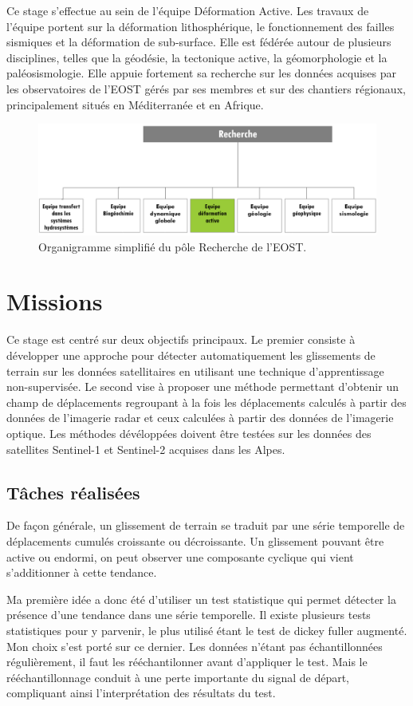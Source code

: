\documentclass[11pt, openany]{report}
\begin{document}
Ce stage s'effectue au sein de l'équipe Déformation Active. Les travaux de l'équipe portent sur la déformation lithosphérique, le fonctionnement des failles sismiques et la déformation de sub-surface. Elle est fédérée autour de plusieurs disciplines, telles que la géodésie, la tectonique active, la géomorphologie et la paléosismologie. Elle appuie fortement sa recherche sur les données acquises par les observatoires de l'EOST gérés par ses membres et sur des chantiers régionaux, principalement situés en Méditerranée et en Afrique.

\begin{figure}[H]
  \centering
  \includegraphics[width=0.6\linewidth]{recherche.png}
  \caption{Organigramme simplifié du pôle Recherche de l'EOST.}
\end{figure}

\chapter{Missions}
Ce stage est centré sur deux objectifs principaux. Le premier consiste à développer une approche pour détecter automatiquement les glissements de terrain sur les données satellitaires en utilisant une technique d'apprentissage non-supervisée. Le second vise à proposer une méthode permettant d'obtenir un champ de déplacements regroupant à la fois les déplacements calculés à partir des données de l'imagerie radar et ceux  calculées à partir des données de l'imagerie optique. Les méthodes dévéloppées doivent être testées sur les données des satellites Sentinel-1 et Sentinel-2 acquises dans les Alpes.
\section{Tâches réalisées}
De façon générale, un glissement de terrain se traduit par une série temporelle de déplacements cumulés croissante ou décroissante. Un glissement pouvant être active ou endormi, on peut observer une composante cyclique qui vient s'additionner à cette tendance.

Ma première idée a donc été d'utiliser un test statistique qui permet détecter la présence d'une tendance dans une série temporelle. Il existe plusieurs tests statistiques pour y parvenir, le plus utilisé étant le test de dickey fuller augmenté. Mon choix s'est porté sur ce dernier. Les données n'étant pas échantillonnées régulièrement, il faut les rééchantilonner avant d'appliquer le test. Mais le rééchantillonnage conduit à une perte importante du signal de départ, compliquant ainsi l'interprétation des résultats du test. 
\end{document}
